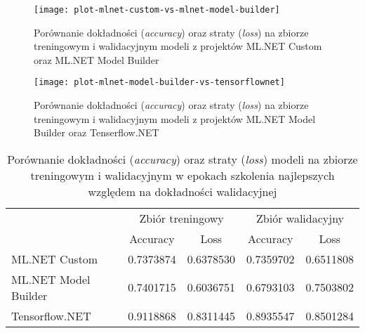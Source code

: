 \begin{figure}[ht]
  \texttt{[image: plot-mlnet-custom-vs-mlnet-model-builder]}
  \caption[Porównanie dokładności oraz straty modeli ML.NET Custom oraz ML.NET Model Builder]{Porównanie dokładności (\emph{accuracy}) oraz straty (\emph{loss}) na zbiorze treningowym i walidacyjnym modeli z projektów ML.NET Custom oraz ML.NET Model Builder}
  \label{fig:plot-mlnet-custom-vs-mlnet-model-builder}
\end{figure}

\begin{figure}[ht]
  \texttt{[image: plot-mlnet-model-builder-vs-tensorflownet]}
  \caption[Porównanie dokładności oraz straty modeli ML.NET Model Builder oraz Tensorflow.NET]{Porównanie dokładności (\emph{accuracy}) oraz straty (\emph{loss}) na zbiorze treningowym i walidacyjnym modeli z projektów ML.NET Model Builder oraz Tenserflow.NET}
  \label{fig:plot-mlnet-model-builder-vs-tensorflownet}
\end{figure}

\begin{table}[ht]
  \centering
  \begin{tabular}{|l|r|r|r|r|}
    \hline
                         & \multicolumn{2}{c|}{Zbiór treningowy}                                          & \multicolumn{2}{c|}{Zbiór walidacyjny}                      \\
    \cline{2-5}
                         & \multicolumn{1}{|c|}{Accuracy}        & \multicolumn{1}{|c|}{Loss}             & \multicolumn{1}{|c|}{Accuracy} & \multicolumn{1}{|c|}{Loss} \\
    \hline
    ML.NET Custom        & 0.7373874                             & 0.6378530                              & 0.7359702                      & 0.6511808                  \\
    ML.NET Model Builder & 0.7401715                             & 0.6036751                              & 0.6793103                      & 0.7503802                  \\
    Tensorflow.NET       & 0.9118868                             & 0.8311445                              & 0.8935547                      & 0.8501284                  \\
    \hline
  \end{tabular}
  \caption[Porównanie dokładności oraz straty modeli na zbiorze treningowym i walidacyjnym]{Porównanie dokładności (\emph{accuracy}) oraz straty (\emph{loss}) modeli na zbiorze treningowym i walidacyjnym w epokach szkolenia najlepszych względem na dokładności walidacyjnej}
  \label{tab:train_validation_metric_comparison}
\end{table}

